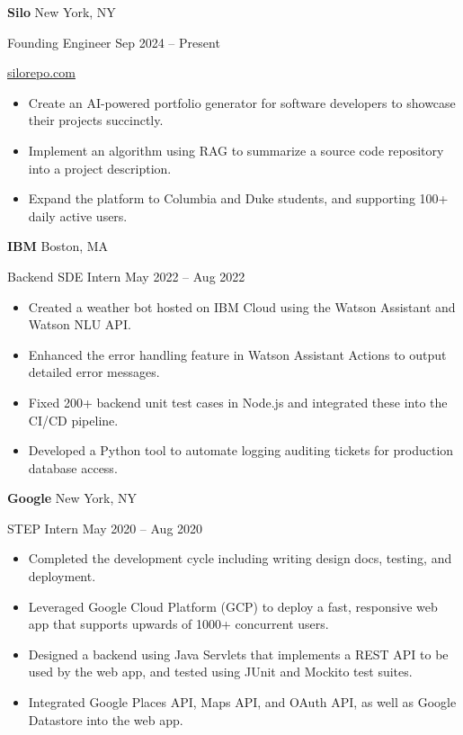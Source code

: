 \documentclass[11pt]{article}
\newcommand{\resumeentry}[4]{%
\textbf{#1} \hfill {\small #2}
\par
{\small #3} \hfill {\small #4}}
\begin{document}
\smallskip

\resumeentry{Silo}{New York, NY}{Founding Engineer}{Sep 2024 -- Present}

{\small \href{https://www.silorepo.com/}{silorepo.com}}

\begin{itemize}
  \item Create an AI-powered portfolio generator for software developers to showcase their projects succinctly.
  \item Implement an algorithm using RAG to summarize a source code repository into a project description.
  \item Expand the platform to Columbia and Duke students, and supporting 100+ daily active users.
\end{itemize}

\smallskip

\resumeentry{IBM}{Boston, MA}{Backend SDE Intern}{May 2022 -- Aug 2022}
\begin{itemize}
  \item Created a weather bot hosted on IBM Cloud using the Watson Assistant and Watson NLU API.
  \item Enhanced the error handling feature in Watson Assistant Actions to output detailed error messages.
  \item Fixed 200+ backend unit test cases in Node.js and integrated these into the CI/CD pipeline.
  \item Developed a Python tool to automate logging auditing tickets for production database access.
\end{itemize}

\smallskip

\resumeentry{Google}{New York, NY}{STEP Intern}{May 2020 -- Aug 2020}
\begin{itemize}
  \item Completed the development cycle including writing design docs, testing, and deployment.
  \item Leveraged Google Cloud Platform (GCP) to deploy a fast, responsive web app that supports upwards of 1000+ concurrent users.
  \item Designed a backend using Java Servlets that implements a REST API to be used by the web app, and tested using JUnit and Mockito test suites.
  \item Integrated Google Places API, Maps API, and OAuth API, as well as Google Datastore into the web app.
\end{itemize}
\end{document}

